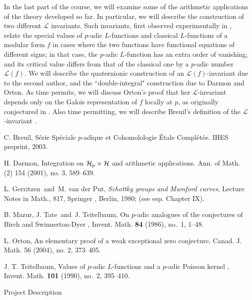 \documentclass{article}
\begin{document}
In the last part of the course, we will examine some of the
arithmetic applications of the theory developed so far.  In
particular, we will describe the construction of two different
$\mathcal{L}$ invariants. Such invariants, first observed
experimentally in \cite{MTT}
,  relate the special values of $p$-adic
$L$-functions and classical $L$-functions of a modular form $f$ in
cases where the two functions have functional equations of different
signs; in that case, the $p$-adic $L$-function has an extra order of
vanishing, and its critical value differs from that of the classical
one by a $p$-adic number $\mathcal{L}(f)$.  We will describe the
quaternionic construction of an $\mathcal{L}(f)$-invariant due to
the second author, and the ``double-integral" construction due to
Darmon and Orton.  As time permits, we will discuss Orton's proof
that her $\mathcal{L}$-invariant depends only on the Galois
representation of $f$ locally at $p$, as originally conjectured in
\cite{MTT}.  Also time permitting, we will describe Breuil's definition of the $\mathcal{L}$-invariant \cite{b}.
\newpage

\begin{thebibliography}{ABC}

 C. Breuil, S\'erie Sp\'eciale $p$-adique et Cohomolologie \'Etale Compl\'et\'ee. IHES preprint, 2003.

 H. Darmon, Integration on $\mathcal{H}\sb p\times\mathcal{H}$ and
arithmetic applications.  Ann. of Math. (2)  154  (2001),  no. 3,
589--639. 

 L. Gerritzen\ and\ M. van der Put,
{\it Schottky groups and Mumford curves}, Lecture Notes in Math.,
817, Springer , Berlin, 1980;  (see esp.
Chapter IX).

B. Mazur, J. Tate\ and\ J. Teitelbaum,
On $p$-adic analogues of the conjectures of Birch and
Swinnerton-Dyer , Invent. Math. {\bf 84} (1986), no.~1, 1--48.

 L. Orton, An elementary proof of a weak exceptional zero
conjecture.  Canad. J. Math.  56  (2004),  no. 2, 373--405.

 J. T. Teitelbaum, Values of $p$-adic $L$-functions and a $p$-adic
Poisson kernel , Invent. Math. {\bf 101} (1990), no.~2, 395--410.

\end{thebibliography}

\newpage
\begin{center}
Project Description
\end{center}
\end{document}
